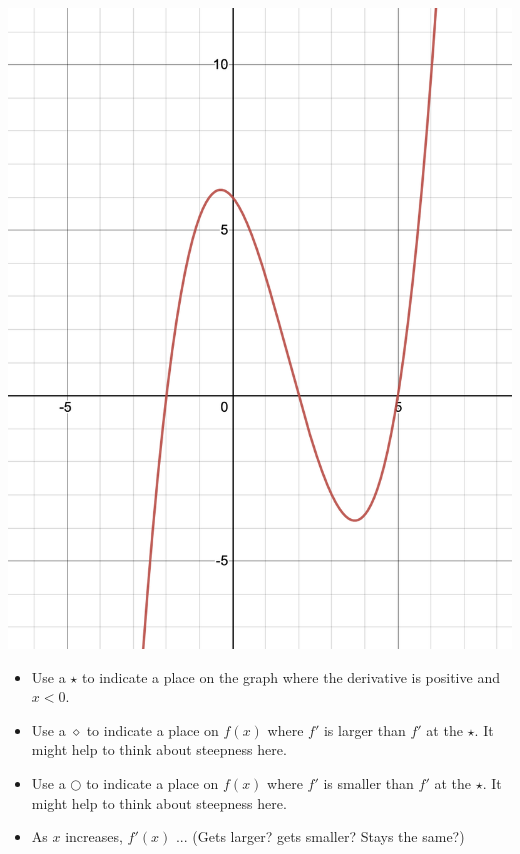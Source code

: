 \documentclass[12pt]{article}
\begin{document}
\begin{multicols}{2}
\includegraphics[scale=0.4, trim=0 80 0 50,clip]{cubic.png}

\begin{itemize}
\item Use a $\star$ to indicate a place on the graph where the derivative is positive and $x<0$.
\item Use a $\diamond$ to indicate a place on $f(x)$ where $f'$ is larger than $f'$ at the $\star$. It might help to think about steepness here.
\item Use a $\bigcirc$ to indicate a place on $f(x)$ where $f'$ is smaller than $f'$ at the $\star$. It might help to think about steepness here.
\item As $x$ increases, $f'(x)$ ... (Gets larger? gets smaller? Stays the same?)
\end{itemize}

 
\end{multicols}
\end{document}

